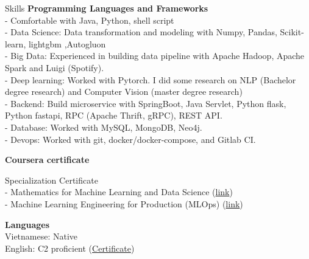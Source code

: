 \documentclass{resume} %
\begin{document}
\begin{rSection}{Skills}
{\bf Programming Languages and Frameworks }
\\ - Comfortable with Java, Python, shell script
\\ - Data Science: Data transformation and modeling with Numpy, Pandas, Scikit-learn, lightgbm ,Autogluon
\\ - Big Data: Experienced in building data pipeline with Apache Hadoop, Apache Spark and Luigi (Spotify).
\\ - Deep learning: Worked with Pytorch. I did some research on NLP (Bachelor degree research) and Computer Vision (master degree research)
\\ - Backend: Build microservice with SpringBoot, Java Servlet, Python flask, Python fastapi, RPC (Apache Thrift, gRPC), REST API. 
\\ - Database: Worked with MySQL, MongoDB, Neo4j. 
\\ - Devops: Worked with git, docker/docker-compose, and Gitlab CI. 


{\bf Coursera certificate }

Specialization Certificate 
\\ - Mathematics for Machine Learning and Data Science (\href{https://coursera.org/share/ae3f40effbceedf3488075d566a95551}{link})
\\ - Machine Learning Engineering for Production (MLOps) (\href{https://coursera.org/share/ce5ec378a0075b8ffdbd5b235f8a84bd}{link})


{\bf Languages}
\\Vietnamese: Native
\\English: C2 proficient (\href{https://www.efset.org/cert/o5HAWP}{Certificate})
\end{rSection}




\end{document}
